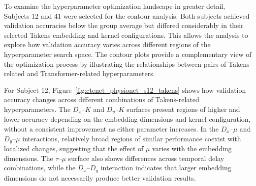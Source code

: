 To examine the hyperparameter optimization landscape in greater detail, Subjects 12 and 41 were selected for the contour analysis. Both subjects achieved validation accuracies below the group average but differed considerably in their selected Takens embedding and kernel configurations. This allows the analysis to explore how validation accuracy varies across different regions of the hyperparameter search space. The contour plots provide a complementary view of the optimization process by illustrating the relationships between pairs of Takens-related and Transformer-related hyperparameters.

For Subject 12, Figure~\ref{fig:ctenet_physionet_s12_takens} shows how validation accuracy changes across different combinations of Takens-related hyperparameters. The $D_x$--$K$ and $D_y$--$K$ surfaces present regions of higher and lower accuracy depending on the embedding dimensions and kernel configuration, without a consistent improvement as either parameter increases. In the $D_x$--$\mu$ and $D_y$--$\mu$ interactions, relatively broad regions of similar performance coexist with localized changes, suggesting that the effect of $\mu$ varies with the embedding dimensions. The $\tau$--$\mu$ surface also shows differences across temporal delay combinations, while the $D_x$--$D_y$ interaction indicates that larger embedding dimensions do not necessarily produce better validation results. 
